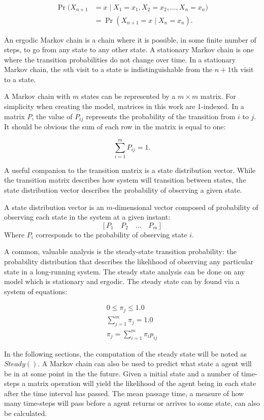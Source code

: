 \begin{align} \Pr(X_{n+1}&=x\mid X_1=x_1, X_2=x_2, \ldots, X_n=x_n)
\nonumber \\ &= \Pr(X_{n+1}=x\mid X_n=x_n). \end{align}

An ergodic Markov chain is a chain where it is possible, in some finite number of steps, to go from any state to any other state.
A stationary Markov chain is one where the transition probabilities do not change over time.
In a stationary Markov chain, the $n$th visit to a state is indistinguishable from the $n+1$th visit to a state.

A Markov chain with $m$ states can be represented by a $m\times m$ matrix.
For simplicity when creating the model, matrices in this work are 1-indexed.
In a matrix $P$, the value of $P_{ij}$ represents the probability of the transition from $i$ to $j$.
It should be obvious the sum of each row in the matrix is equal to one:

\begin{equation} \sum_{i=1}^{m} P_{ij} = 1. \end{equation}

A useful companion to the transition matrix is a state distribution vector.
While the transition matrix describes how system will transition between states, the state distribution vector describes the probability of observing a given state.

\begin{pdef}
A state distribution vector is an $m$-dimensional vector composed of probability of observing each state in the system at a given instant:
\[ [P_{1} \quad P_{2} \quad \ldots \quad P_{m} ] \]
Where $P_{i}$ corresponds to the probability of observing state $i$.
\end{pdef}

A common, valuable analysis is the steady-state transition probability: the probability distribution that describes the likelihood of observing any particular state in a long-running system. The steady state analysis can be done on any model which is stationary and ergodic. The steady state can by found via a system of equations: \cite{MARKOV3}

\begin{align}
0\leq\pi_j\leq1.0 \\
\sum_{j = 1}^{m}\pi_j = 1.0 \\
\pi_j = \sum_{i=1}^{m} \pi_i p_{ij}
\end{align}

In the following sections, the computation of the steady state will be noted as $Steady()$.
A Markov chain can also be used to predict what state a agent will be in at some point in the the future.
Given a initial state and a number of time-steps a matrix operation will yield the likelihood of the agent being in each state after the time interval has passed.
The mean passage time, a measure of how many time-steps will pass before a agent returns or arrives to some state, can also be calculated.

